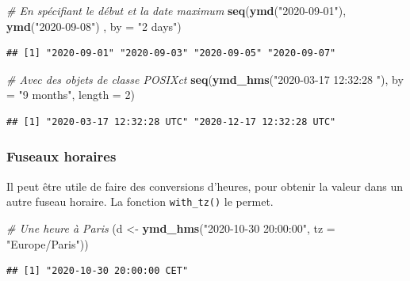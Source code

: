\documentclass[
  11pt,
]{book}
\newenvironment{Shaded}{\begin{snugshade}}{\end{snugshade}}
\newcommand{\CommentTok}[1]{\textcolor[rgb]{0.56,0.35,0.01}{\textit{#1}}}
\newcommand{\DataTypeTok}[1]{\textcolor[rgb]{0.13,0.29,0.53}{#1}}
\newcommand{\DecValTok}[1]{\textcolor[rgb]{0.00,0.00,0.81}{#1}}
\newcommand{\KeywordTok}[1]{\textcolor[rgb]{0.13,0.29,0.53}{\textbf{#1}}}
\newcommand{\NormalTok}[1]{#1}
\newcommand{\StringTok}[1]{\textcolor[rgb]{0.31,0.60,0.02}{#1}}
\numberwithin{equation}{section}
\numberwithin{countremarque}{section}
\begin{document}
\begin{Shaded}
\begin{Highlighting}[]
\CommentTok{\# En spécifiant le début et la date maximum}
\KeywordTok{seq}\NormalTok{(}\KeywordTok{ymd}\NormalTok{(}\StringTok{"2020{-}09{-}01"}\NormalTok{), }\KeywordTok{ymd}\NormalTok{(}\StringTok{"2020{-}09{-}08"}\NormalTok{) , }\DataTypeTok{by =} \StringTok{"2 days"}\NormalTok{) }
\end{Highlighting}
\end{Shaded}

\begin{lstlisting}
## [1] "2020-09-01" "2020-09-03" "2020-09-05" "2020-09-07"
\end{lstlisting}

\begin{Shaded}
\begin{Highlighting}[]
\CommentTok{\# Avec des objets de classe POSIXct}
\KeywordTok{seq}\NormalTok{(}\KeywordTok{ymd\_hms}\NormalTok{(}\StringTok{"2020{-}03{-}17 12:32:28 "}\NormalTok{), }\DataTypeTok{by =} \StringTok{"9 months"}\NormalTok{, }\DataTypeTok{length =} \DecValTok{2}\NormalTok{)}
\end{Highlighting}
\end{Shaded}

\begin{lstlisting}
## [1] "2020-03-17 12:32:28 UTC" "2020-12-17 12:32:28 UTC"
\end{lstlisting}

\hypertarget{fuseaux-horaires}{%
\subsubsection{Fuseaux horaires}\label{fuseaux-horaires}}

Il peut être utile de faire des conversions d'heures, pour obtenir la valeur dans un autre fuseau horaire. La fonction \texttt{with\_tz()} le permet.

\begin{Shaded}
\begin{Highlighting}[]
\CommentTok{\# Une heure à Paris}
\NormalTok{(d \textless{}{-}}\StringTok{ }\KeywordTok{ymd\_hms}\NormalTok{(}\StringTok{"2020{-}10{-}30 20:00:00"}\NormalTok{, }\DataTypeTok{tz =} \StringTok{"Europe/Paris"}\NormalTok{))}
\end{Highlighting}
\end{Shaded}

\begin{lstlisting}
## [1] "2020-10-30 20:00:00 CET"
\end{lstlisting}
\end{document}

